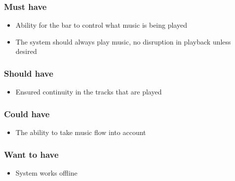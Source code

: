 \subsubsection{Must have}

\begin{itemize}\label{musthave}
        \item Ability for the bar to control what music is being played
        \item The system should always play music, no disruption in playback unless desired
\end{itemize}

\subsubsection{Should have}

\begin{itemize}
        \item Ensured continuity in the tracks that are played
\end{itemize}

\subsubsection{Could have}

\begin{itemize}
        \item The ability to take music flow into account
\end{itemize}

\subsubsection{Want to have}

\begin{itemize}
        \item System works offline
\end{itemize}
